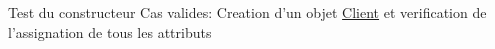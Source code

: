 
\begin{DoxyRefList}
\item[Member \mbox{\hyperlink{ClientTesteur_8cpp_a316ba8689fe28fdf0ddc35c9218a15c3}{TEST}} (Client\+Test, Client\+Test\+\_\+constructeur\+\_\+par\+Defaut\+\_\+objet\+Valide)]\label{test__test000001}%
%
Test du constructeur Cas valides\+: Creation d’un objet \mbox{\hyperlink{classClient}{Client}} et verification de l’assignation de tous les attributs 
\end{DoxyRefList}